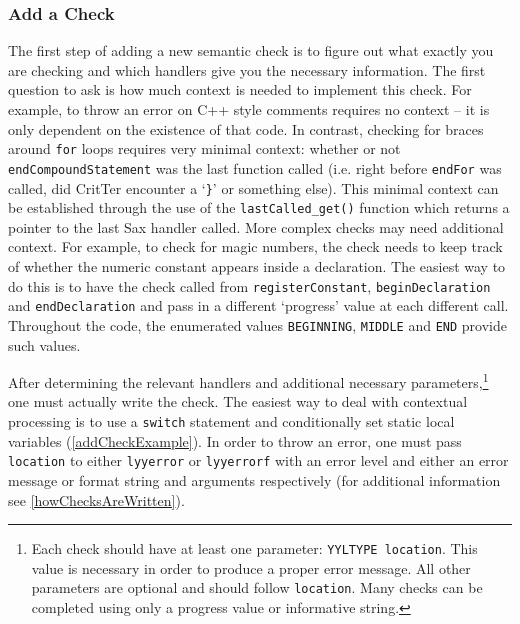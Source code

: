 \documentclass[12pt]{report}
\newcommand{\programName}{CritTer\xspace}
\begin{document}
\subsubsection{Add a Check}

The first step of adding a new semantic check is to figure out what exactly you are checking and which 
handlers give you the necessary information. The first question to ask is how much context is needed to 
implement this check. For example, to throw an error on C++ style comments requires no context -- it is 
only dependent on the existence of that code. In contrast, checking for braces around \lstinline{for} loops 
requires very minimal context: whether or not \lstinline{endCompoundStatement} was the last function 
called (i.e. right before \lstinline{endFor} was called, did \programName encounter a `\lstinline!}!' or 
something else). This minimal context can be established through the use of the 
\lstinline{lastCalled_get()} function which returns a pointer to the last Sax handler called. More complex 
checks may need additional context. For example, to check for magic numbers, the check needs to keep 
track of whether the numeric constant appears inside a declaration. The easiest way to do this is to have 
the check called from \lstinline{registerConstant}, \lstinline{beginDeclaration} and 
\lstinline{endDeclaration} and pass in a different `progress' value at each different call. Throughout the 
code, the enumerated values \lstinline{BEGINNING}, \lstinline{MIDDLE} and \lstinline{END} provide 
such values.

After determining the relevant handlers and additional necessary parameters,\footnote{Each check 
should have at least one parameter: \lstinline{YYLTYPE location}. This value is necessary in order to 
produce a proper error message. All other parameters are optional and should follow \lstinline{location}. 
Many checks can be completed using only a progress value or informative string.} one must actually 
write the check. The easiest way to deal with contextual processing is to use a \lstinline{switch} 
statement and conditionally set static local variables (\autoref{addCheckExample}). In order to 
throw an error, one must pass \lstinline{location} to either \lstinline{lyyerror} or \lstinline{lyyerrorf} with an 
error level and either an error message or format string and arguments respectively (for additional 
information see \autoref{howChecksAreWritten}).
\end{document}
